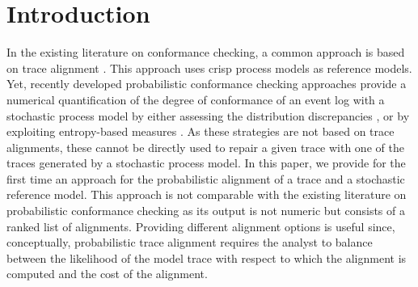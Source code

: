 \section{Introduction}


\label{introduction}
%
In the existing literature on conformance checking, a common approach is based on trace alignment \cite{DBLP:conf/edoc/AdriansyahDA11}. This approach uses crisp process models as reference models. Yet, recently developed probabilistic conformance checking approaches provide a numerical quantification of the degree of conformance
of an event log with a stochastic process model by either assessing the distribution discrepancies \cite{DBLP:conf/bpm/LeemansSA19}, or by exploiting entropy-based measures \cite{DBLP:conf/icpm/PolyvyanyyK19,DBLP:journals/tosem/PolyvyanyySWCM20}.
As these strategies are not based on trace alignments, these cannot be directly used to repair a given trace with one of the traces generated by a stochastic process model.
%
In this paper, we provide for the first time an approach for the probabilistic alignment of a trace and a stochastic reference
model. This approach is not comparable with the existing literature on probabilistic conformance checking as its output is not numeric but consists of a ranked list of alignments.
Providing different alignment options is useful since, conceptually, probabilistic trace alignment requires the analyst to 
balance between the likelihood of the model trace with respect to which the alignment is computed and the cost of the alignment. 

